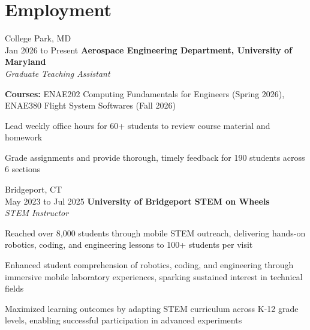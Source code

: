 \section{Employment}
    \begin{twocolentry}{College Park, MD \\ Jan 2026 to Present}
        \textbf{Aerospace Engineering Department, University of Maryland}\\
        \textit{Graduate Teaching Assistant}
    \end{twocolentry}

    \vspace{0.10 cm}
    \begin{onecolentry}
        \begin{highlights}
        	\item \textbf{Courses:} ENAE202 Computing Fundamentals for Engineers (Spring 2026), ENAE380 Flight System Softwares (Fall 2026)
        	\item Lead weekly office hours for 60+ students to review course material and homework
        	\item Grade assignments and provide thorough, timely feedback for 190 students across 6 sections
        \end{highlights}
    \end{onecolentry}
    
    \vspace{0.20 cm}

    \begin{twocolentry}{Bridgeport, CT \\ May 2023 to Jul 2025}
        \textbf{University of Bridgeport STEM on Wheels}\\
        \textit{STEM Instructor}
        \end{twocolentry}

    \vspace{0.10 cm}
    \begin{onecolentry}
        \begin{highlights}
          \item Reached over 8,000 students through mobile STEM outreach, delivering hands-on robotics, coding, and engineering lessons to 100+ students per visit
          \item Enhanced student comprehension of robotics, coding, and engineering through immersive mobile laboratory experiences, sparking sustained interest in technical fields
          \item Maximized learning outcomes by adapting STEM curriculum across K-12 grade levels, enabling successful participation in advanced experiments
        \end{highlights}
    \end{onecolentry}  
    
